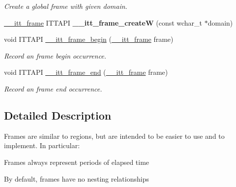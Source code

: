 \begin{DoxyCompactItemize}
\begin{DoxyCompactList}\small\item\em Create a global frame with given domain. \end{DoxyCompactList}\item 
\hypertarget{group__frames_gafced67ce3fdb934507bafaedca2c4ed4}{}\hyperlink{group__frames_gad1b74516ce88dc28bff032244625c7c2}{\+\_\+\+\_\+itt\+\_\+frame} I\+T\+T\+A\+P\+I {\bfseries \+\_\+\+\_\+itt\+\_\+frame\+\_\+create\+W} (const wchar\+\_\+t $\ast$domain)\label{group__frames_gafced67ce3fdb934507bafaedca2c4ed4}

\item 
\hypertarget{group__frames_ga270e37da31aa32c8e2fbd0b71247e774}{}void I\+T\+T\+A\+P\+I \hyperlink{group__frames_ga270e37da31aa32c8e2fbd0b71247e774}{\+\_\+\+\_\+itt\+\_\+frame\+\_\+begin} (\hyperlink{group__frames_gad1b74516ce88dc28bff032244625c7c2}{\+\_\+\+\_\+itt\+\_\+frame} frame)\label{group__frames_ga270e37da31aa32c8e2fbd0b71247e774}

\begin{DoxyCompactList}\small\item\em Record an frame begin occurrence. \end{DoxyCompactList}\item 
\hypertarget{group__frames_ga2f91556b78eae2fc509127af8db2aba5}{}void I\+T\+T\+A\+P\+I \hyperlink{group__frames_ga2f91556b78eae2fc509127af8db2aba5}{\+\_\+\+\_\+itt\+\_\+frame\+\_\+end} (\hyperlink{group__frames_gad1b74516ce88dc28bff032244625c7c2}{\+\_\+\+\_\+itt\+\_\+frame} frame)\label{group__frames_ga2f91556b78eae2fc509127af8db2aba5}

\begin{DoxyCompactList}\small\item\em Record an frame end occurrence. \end{DoxyCompactList}\end{DoxyCompactItemize}


\subsection{Detailed Description}
Frames are similar to regions, but are intended to be easier to use and to implement. In particular\+:
\begin{DoxyItemize}
\item Frames always represent periods of elapsed time
\item By default, frames have no nesting relationships
\end{DoxyItemize}

